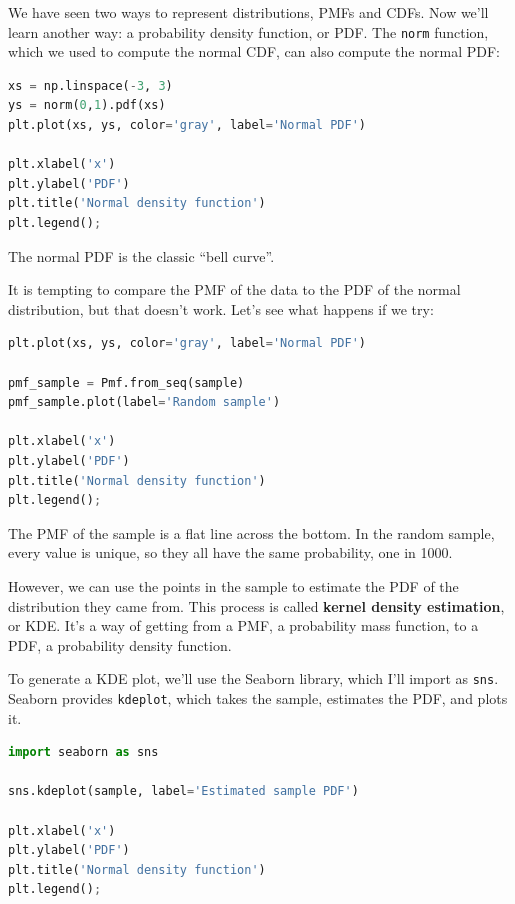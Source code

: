 We have seen two ways to represent distributions, PMFs and CDFs. Now
we'll learn another way: a probability density function, or PDF. The
\passthrough{\lstinline!norm!} function, which we used to compute the
normal CDF, can also compute the normal PDF:

\begin{lstlisting}[language=Python,style=source]
xs = np.linspace(-3, 3)
ys = norm(0,1).pdf(xs)
plt.plot(xs, ys, color='gray', label='Normal PDF')

plt.xlabel('x')
plt.ylabel('PDF')
plt.title('Normal density function')
plt.legend();
\end{lstlisting}

The normal PDF is the classic ``bell curve''.

It is tempting to compare the PMF of the data to the PDF of the normal
distribution, but that doesn't work. Let's see what happens if we try:

\begin{lstlisting}[language=Python,style=source]
plt.plot(xs, ys, color='gray', label='Normal PDF')

pmf_sample = Pmf.from_seq(sample)
pmf_sample.plot(label='Random sample')

plt.xlabel('x')
plt.ylabel('PDF')
plt.title('Normal density function')
plt.legend();
\end{lstlisting}

The PMF of the sample is a flat line across the bottom. In the random
sample, every value is unique, so they all have the same probability,
one in 1000.

However, we can use the points in the sample to estimate the PDF of the
distribution they came from. This process is called \textbf{kernel
density estimation}, or KDE. It's a way of getting from a PMF, a
probability mass function, to a PDF, a probability density function.

To generate a KDE plot, we'll use the Seaborn library, which I'll import
as \passthrough{\lstinline!sns!}. Seaborn provides
\passthrough{\lstinline!kdeplot!}, which takes the sample, estimates the
PDF, and plots it.

\begin{lstlisting}[language=Python,style=source]
import seaborn as sns

sns.kdeplot(sample, label='Estimated sample PDF')

plt.xlabel('x')
plt.ylabel('PDF')
plt.title('Normal density function')
plt.legend();
\end{lstlisting}

